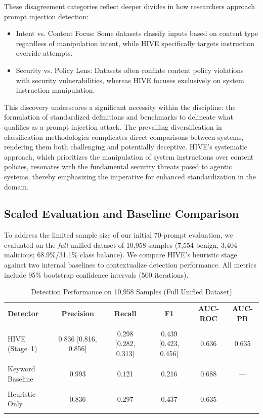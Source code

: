\documentclass[manuscript,screen,review]{acmart}
\begin{document}
These disagreement categories reflect deeper divides in how researchers approach prompt injection detection:

\begin{itemize}
\item Intent vs. Content Focus: Some datasets classify inputs based on content type regardless of manipulation intent, while HIVE specifically targets instruction override attempts.
\item Security vs. Policy Lens: Datasets often conflate content policy violations with security vulnerabilities, whereas HIVE focuses exclusively on system instruction manipulation.
\end{itemize}

This discovery underscores a significant necessity within the discipline: the formulation of standardized definitions and benchmarks to delineate what qualifies as a prompt injection attack. The prevailing diversification in classification methodologies complicates direct comparisons between systems, rendering them both challenging and potentially deceptive. HIVE's systematic approach, which prioritizes the manipulation of system instructions over content policies, resonates with the fundamental security threats posed to agentic systems, thereby emphasizing the imperative for enhanced standardization in the domain.

\subsection{Scaled Evaluation and Baseline Comparison}
\label{sec:scaled-eval}

To address the limited sample size of our initial 70-prompt evaluation, we evaluated on the \emph{full} unified dataset of 10{,}958 samples (7{,}554 benign, 3{,}404 malicious; 68.9\%/31.1\% class balance). We compare HIVE's heuristic stage against two internal baselines to contextualize detection performance. All metrics include 95\% bootstrap confidence intervals (500 iterations).

\begin{table}[h]
\caption{Detection Performance on 10{,}958 Samples (Full Unified Dataset)}
\label{tab:scaled-eval}
\centering
\small
\begin{tabular}{lccccc}
\toprule
\textbf{Detector} & \textbf{Precision} & \textbf{Recall} & \textbf{F1} & \textbf{AUC-ROC} & \textbf{AUC-PR} \\\\
\midrule
HIVE (Stage~1) & 0.836 {\scriptsize [0.816, 0.856]} & 0.298 {\scriptsize [0.282, 0.313]} & 0.439 {\scriptsize [0.423, 0.456]} & 0.636 & 0.635 \\\\
Keyword Baseline & 0.993 & 0.121 & 0.216 & 0.688 & --- \\\\
Heuristic-Only & 0.836 & 0.297 & 0.437 & 0.635 & --- \\\\
\bottomrule
\end{tabular}
\end{table}
\end{document}

